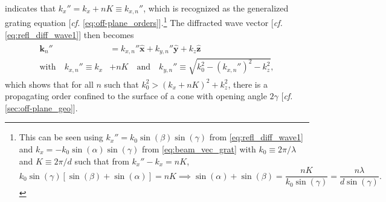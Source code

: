 indicates that $k_x'' = k_x + n K \equiv k_{x,n}''$, which is recognized as the generalized grating equation [\emph{cf.\@} \cref{eq:off-plane_orders}].\footnote{This can be seen using $k_x'' = k_0 \sin \left( \beta \right) \sin \left( \gamma \right)$ from \cref{eq:refl_diff_wave1} and $k_x = - k_0 \sin \left( \alpha \right) \sin \left( \gamma \right)$ from \cref{eq:beam_vec_grat} with $k_0 \equiv 2 \pi / \lambda$ and $K \equiv 2 \pi / d$ such that from $k_x'' - k_x = nK$,
\begin{equation*}
 k_0 \sin \left( \gamma \right) \left[ \sin \left( \beta \right) + \sin \left( \alpha \right) \right] = nK \implies \sin \left( \alpha \right) + \sin \left( \beta \right) = \frac{n K}{k_0 \sin \left( \gamma \right)} = \frac{n \lambda}{d \sin \left( \gamma \right)} .
 \end{equation*}} 
The diffracted wave vector [\emph{cf.\@} \cref{eq:refl_diff_wave1}] then becomes 
\begin{align}
 \begin{split}\label{eq:refl_diff_wave2}
 \mathbold{k}_n'' &= k_{x,n}'' \mathbold{\hat{x}} + k_{y,n}'' \mathbold{\hat{y}} + k_z \mathbold{\hat{z}} \\
 \text{with} \quad k_{x,n}'' \equiv k_x &+ nK \quad \text{and} \quad k_{y,n}'' \equiv \sqrt{k_0^2 - \left( k_{x,n}''\right)^2 - k_z^2} , 
 \end{split}
 \end{align}
which shows that for all $n$ such that $k_0^2 > \left( k_x + nK \right)^2 + k_z^2$, there is a propagating order confined to the surface of a cone with opening angle $2 \gamma$ [\emph{cf.\@} \cref{sec:off-plane_geo}]. 

